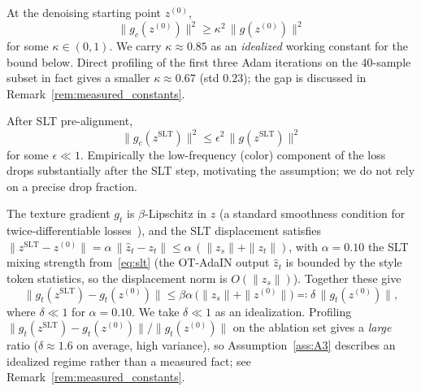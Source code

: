 \begin{assumption}\label{ass:A1}
At the denoising starting point $z^{(0)}$,
\begin{equation}
  \|g_c(z^{(0)})\|^2 \geq \kappa^2\,\|g(z^{(0)})\|^2
  \label{eq:supp_A1}
\end{equation}
for some $\kappa \in (0,1)$.
We carry $\kappa \approx 0.85$ as an \emph{idealized} working constant for the
bound below. Direct profiling of the first three Adam iterations on the
40-sample subset in fact gives a smaller $\kappa \approx 0.67$ (std $0.23$);
the gap is discussed in Remark~\ref{rem:measured_constants}.
\end{assumption}

\begin{assumption}\label{ass:A2}
After SLT pre-alignment,
\begin{equation}
  \|g_c(z^\mathrm{SLT})\|^2 \leq \epsilon^2\,\|g(z^\mathrm{SLT})\|^2
  \label{eq:supp_A2}
\end{equation}
for some $\epsilon \ll 1$.
Empirically the low-frequency (color) component of the loss drops
substantially after the SLT step, motivating the assumption; we do not rely on
a precise drop fraction.
\end{assumption}

\begin{assumption}\label{ass:A3}
The texture gradient $g_t$ is $\beta$-Lipschitz in $z$ (a standard smoothness
condition for twice-differentiable losses~\cite{kingma2015adam}), and the SLT
displacement satisfies
$\|z^\mathrm{SLT} - z^{(0)}\| = \alpha\,\|\hat{z}_t - z_t\|
\leq \alpha\,(\|z_s\| + \|z_t\|)$,
with $\alpha = 0.10$ the SLT mixing strength from~\eqref{eq:slt}
(the OT-AdaIN output $\hat{z}_t$ is bounded by the style token statistics,
so the displacement norm is $O(\|z_s\|)$).
Together these give
\begin{equation}
  \|g_t(z^\mathrm{SLT}) - g_t(z^{(0)})\|
  \leq \beta\alpha\,\bigl(\|z_s\| + \|z^{(0)}\|\bigr)
  \eqqcolon \delta\,\|g_t(z^{(0)})\|,
  \label{eq:supp_A3}
\end{equation}
where $\delta \ll 1$ for $\alpha = 0.10$.
We take $\delta \ll 1$ as an idealization. Profiling
$\|g_t(z^\mathrm{SLT}) - g_t(z^{(0)})\|/\|g_t(z^{(0)})\|$ on the ablation set
gives a \emph{large} ratio ($\delta \approx 1.6$ on average, high variance), so
Assumption~\ref{ass:A3} describes an idealized regime rather than a measured
fact; see Remark~\ref{rem:measured_constants}.
\end{assumption}

